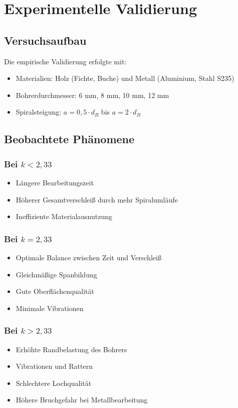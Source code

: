 ﻿\documentclass[12pt,a4paper]{article}
\begin{document}
\section{Experimentelle Validierung}

\subsection{Versuchsaufbau}

Die empirische Validierung erfolgte mit:
\begin{itemize}
	\item Materialien: Holz (Fichte, Buche) und Metall (Aluminium, Stahl S235)
	\item Bohrerdurchmesser: 6 mm, 8 mm, 10 mm, 12 mm
	\item Spiralsteigung: $a = 0{,}5 \cdot d_B$ bis $a = 2 \cdot d_B$
\end{itemize}

\subsection{Beobachtete Phänomene}

\subsubsection{Bei $k < 2{,}33$}
\begin{itemize}
	\item Längere Bearbeitungszeit
	\item Höherer Gesamtverschleiß durch mehr Spiralumläufe
	\item Ineffiziente Materialausnutzung
\end{itemize}

\subsubsection{Bei $k = 2{,}33$}
\begin{itemize}
	\item Optimale Balance zwischen Zeit und Verschleiß
	\item Gleichmäßige Spanbildung
	\item Gute Oberflächenqualität
	\item Minimale Vibrationen
\end{itemize}

\subsubsection{Bei $k > 2{,}33$}
\begin{itemize}
	\item Erhöhte Randbelastung des Bohrers
	\item Vibrationen und Rattern
	\item Schlechtere Lochqualität
	\item Höhere Bruchgefahr bei Metallbearbeitung
\end{itemize}
\end{document}
